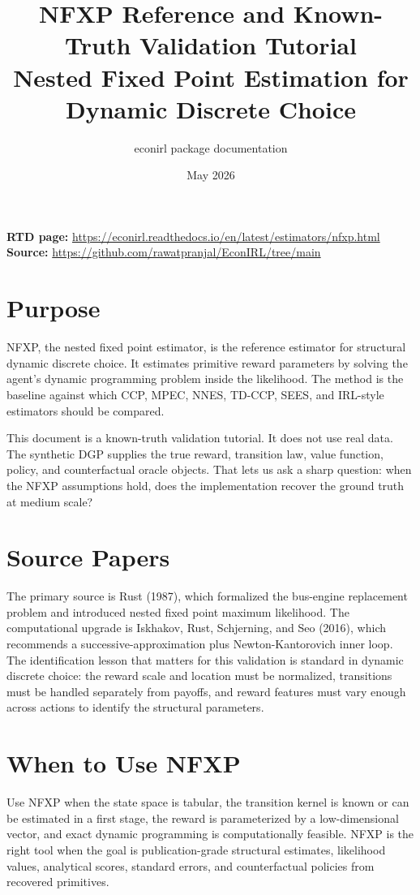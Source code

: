 \documentclass[10pt]{article}
\title{NFXP Reference and Known-Truth Validation Tutorial\\[3pt]
\large Nested Fixed Point Estimation for Dynamic Discrete Choice}
\author{econirl package documentation}
\date{May 2026}
\begin{document}
\maketitle

\begin{center}
\small
\textbf{RTD page:}
\url{https://econirl.readthedocs.io/en/latest/estimators/nfxp.html}
\quad
\textbf{Source:}
\url{https://github.com/rawatpranjal/EconIRL/tree/main}
\end{center}

\section{Purpose}

NFXP, the nested fixed point estimator, is the reference estimator for structural
dynamic discrete choice. It estimates primitive reward parameters by solving the
agent's dynamic programming problem inside the likelihood. The method is the
baseline against which CCP, MPEC, NNES, TD-CCP, SEES, and IRL-style estimators
should be compared.

This document is a known-truth validation tutorial. It does not use real data.
The synthetic DGP supplies the true reward, transition law, value function,
policy, and counterfactual oracle objects. That lets us ask a sharp question:
when the NFXP assumptions hold, does the implementation recover the ground
truth at medium scale?

\section{Source Papers}

The primary source is Rust (1987), which formalized the bus-engine replacement
problem and introduced nested fixed point maximum likelihood. The computational
upgrade is Iskhakov, Rust, Schjerning, and Seo (2016), which recommends a
successive-approximation plus Newton-Kantorovich inner loop. The identification
lesson that matters for this validation is standard in dynamic discrete choice:
the reward scale and location must be normalized, transitions must be handled
separately from payoffs, and reward features must vary enough across actions to
identify the structural parameters.

\section{When to Use NFXP}

Use NFXP when the state space is tabular, the transition kernel is known or can
be estimated in a first stage, the reward is parameterized by a low-dimensional
vector, and exact dynamic programming is computationally feasible. NFXP is the
right tool when the goal is publication-grade structural estimates, likelihood
values, analytical scores, standard errors, and counterfactual policies from
recovered primitives.
\end{document}
